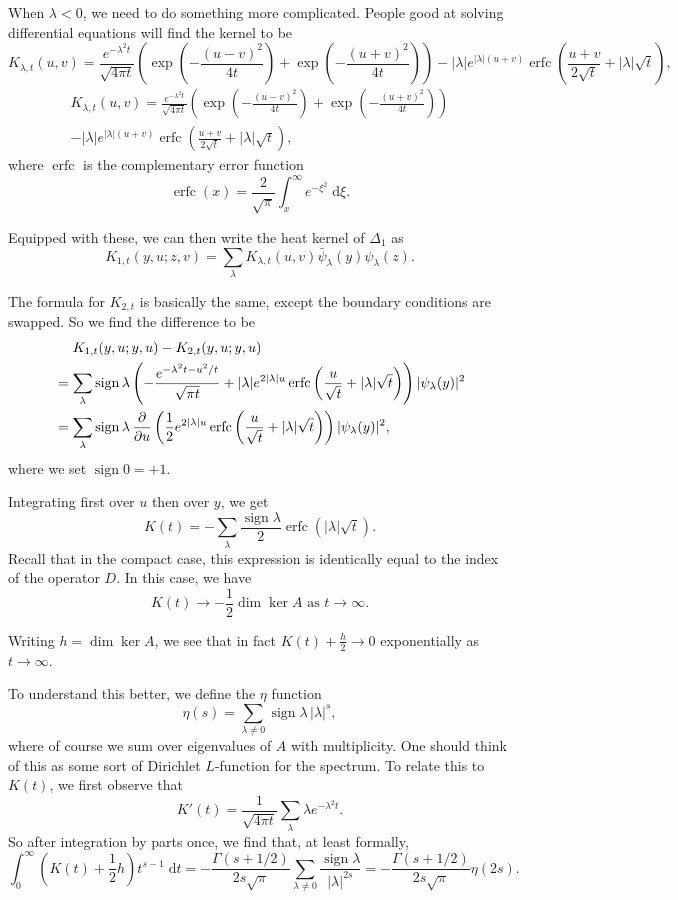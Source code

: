 \documentclass{shortart}
\theoremstyle{definition}
\renewcommand\d{\mathrm{d}}
\DeclareMathOperator\sign{sign}
\DeclareMathOperator\erfc{erfc}
\begin{document}
When $\lambda < 0$, we need to do something more complicated. People good at solving differential equations will find the kernel to be
\ifplastex
  \[
    K_{\lambda, t}(u, v) = \frac{e^{-\lambda^2 t}}{\sqrt{4\pi t}} \left(\exp \left(-\frac{(u - v)^2}{4t}\right) + \exp\left(-\frac{(u + v)^2}{4t}\right)\right) - |\lambda| e^{|\lambda|(u + v)} \erfc \left(\frac{u + v}{2\sqrt{t}} + |\lambda| \sqrt{t}\right),
  \]
\else
  \begin{multline*}
    K_{\lambda, t}(u, v) = \frac{e^{-\lambda^2 t}}{\sqrt{4\pi t}} \left(\exp \left(-\frac{(u - v)^2}{4t}\right) + \exp\left(-\frac{(u + v)^2}{4t}\right)\right) \\
    - |\lambda| e^{|\lambda|(u + v)} \erfc \left(\frac{u + v}{2\sqrt{t}} + |\lambda| \sqrt{t}\right),
  \end{multline*}
\fi
where $\erfc$ is the complementary error function
\[
  \erfc (x) = \frac{2}{\sqrt{\pi}} \int_x^\infty e^{- \xi^2}\;\d \xi.
\]

Equipped with these, we can then write the heat kernel of $\Delta_1$ as
\[
  K_{1, t}(y, u; z, v) = \sum_\lambda K_{\lambda, t}(u, v) \bar{\psi}_\lambda(y) \psi_\lambda(z).
\]

The formula for $K_{2, t}$ is basically the same, except the boundary conditions are swapped. So we find the difference to be
\[
  \begin{aligned}
    &\hphantom{{}={}}K_{1, t}(y, u; y, u) - K_{2, t}(y, u; y, u)\\
    &= \sum_\lambda \sign \lambda \left(-\frac{e^{-\lambda^2t - u^2/t}}{\sqrt{\pi t}} + |\lambda| e^{2|\lambda| u} \erfc \left(\frac{u}{\sqrt{t}} + |\lambda| \sqrt{t}\right)\right) |\psi_\lambda(y)|^2\\
    &= \sum_\lambda \sign \lambda\, \frac{\partial}{\partial u}\left(\frac{1}{2} e^{2|\lambda|u} \erfc \left(\frac{u}{\sqrt{t}} + |\lambda|\sqrt{t}\right)\right) |\psi_\lambda(y)|^2,
  \end{aligned}
\]
where we set $\sign 0 = +1$.

Integrating first over $u$ then over $y$, we get
\[
  K(t) = -\sum_\lambda \frac{\sign \lambda}{2} \erfc (|\lambda|\sqrt{t}).
\]
Recall that in the compact case, this expression is identically equal to the index of the operator $D$. In this case, we have
\[
  K(t) \to -\frac{1}{2} \dim \ker A \text{ as } t \to \infty.
\]

Writing $h = \dim \ker A$, we see that in fact $K(t) + \frac{h}{2} \to 0$ exponentially as $t \to \infty$.

To understand this better, we define the $\eta$ function
\[
  \eta(s) = \sum_{\lambda \not= 0} \sign \lambda \,|\lambda|^s,
\]
where of course we sum over eigenvalues of $A$ with multiplicity. One should think of this as some sort of Dirichlet $L$-function for the spectrum. To relate this to $K(t)$, we first observe that
\[
  K'(t) = \frac{1}{\sqrt{4\pi t}} \sum_\lambda \lambda e^{-\lambda^2 t}.
\]
So after integration by parts once, we find that, at least formally,
\[
  \int_0^\infty \left(K(t) + \frac{1}{2}h\right) t^{s - 1} \;\d t = - \frac{\Gamma(s + 1/2)}{2s \sqrt{\pi}} \sum_{\lambda \not= 0} \frac{\sign \lambda}{|\lambda|^{2s}} = - \frac{\Gamma(s + 1/2)}{2s\sqrt{\pi}} \eta(2s).
\]
\end{document}
